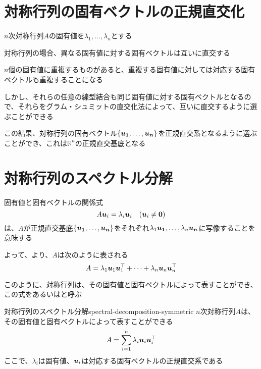 \documentclass[../../../topic_linear-algebra]{subfiles}
\begin{document}
\sectionline
\section{対称行列の固有ベクトルの正規直交化}\label{sec:orthogonalization-eigenvectors-symmetric}

$n$次対称行列$A$の固有値を$\lambda_1,\ldots,\lambda_n$とする

対称行列の場合、異なる固有値に対する固有ベクトルは互いに直交する

\br

$n$個の固有値に重複するものがあると、重複する固有値に対しては対応する固有ベクトルも重複することになる

しかし、それらの任意の線型結合も同じ固有値に対する固有ベクトルとなるので、それらをグラム・シュミットの直交化法によって、互いに直交するように選ぶことができる

\br

この結果、対称行列の固有ベクトル$\{ \vb*{u_1}, \ldots, \vb*{u_n} \}$を正規直交系となるように選ぶことができ、これは$\mathbb{R}^n$の正規直交基底となる

\sectionline
\section{対称行列のスペクトル分解}

固有値と固有ベクトルの関係式
\begin{equation*}
  A\vb*{u}_i = \lambda_i\vb*{u}_i \quad (\vb*{u}_i \neq \vb*{0})
\end{equation*}
は、$A$が正規直交基底$\{ \vb*{u_1}, \ldots, \vb*{u_n} \}$をそれぞれ$\lambda_1 \vb*{u_1}, \ldots, \lambda_n \vb*{u_n}$に写像することを意味する

\br

よって、より、$A$は次のように表される
\begin{equation*}
  A = \lambda_1 \vb*{u}_1 \vb*{u}_1^\top + \cdots + \lambda_n \vb*{u}_n \vb*{u}_n^\top
\end{equation*}

このように、対称行列は、その固有値と固有ベクトルによって表すことができ、この式をあるいはと呼ぶ

\begin{theorem}{対称行列のスペクトル分解}{spectral-decomposition-symmetric}
  $n$次対称行列$A$は、その固有値と固有ベクトルによって表すことができる
  \begin{equation*}
    A = \sum_{i=1}^n \lambda_i \vb*{u}_i \vb*{u}_i^\top
  \end{equation*}
  ここで、$\lambda_i$は固有値、$\vb*{u}_i$は対応する固有ベクトルの正規直交系である
\end{theorem}
\end{document}
